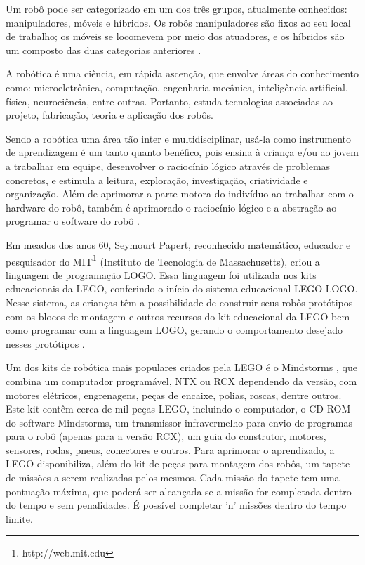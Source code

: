 Um robô pode ser categorizado em um dos três grupos, atualmente conhecidos: manipuladores, móveis e híbridos. Os robôs manipuladores são fixos ao seu local de trabalho; os móveis se locomevem por meio dos atuadores, e os híbridos são um composto das duas categorias anteriores  .

A robótica é uma ciência, em rápida ascenção, que envolve áreas do conhecimento como: microeletrônica, computação, engenharia mecânica, inteligência artificial, física, neurociência, entre outras. Portanto, estuda tecnologias associadas ao projeto, fabricação, teoria e aplicação dos robôs.
	
Sendo a robótica uma área tão inter e multidisciplinar, usá-la como instrumento de aprendizagem é um tanto quanto benéfico, pois ensina à criança e/ou ao jovem a trabalhar em equipe, desenvolver o raciocínio lógico através de problemas concretos, e estimula a leitura, exploração, investigação, criatividade e organização. Além de aprimorar a parte motora do indivíduo ao trabalhar com o hardware do robô, também é aprimorado o raciocínio lógico e a abstração ao programar o software do robô \cite{da2009roboeduc}. 

Em meados dos anos 60, Seymourt Papert, reconhecido matemático, educador e pesquisador do MIT\footnote{http://web.mit.edu} (Instituto de Tecnologia de Massachusetts), criou a linguagem de programação LOGO. Essa linguagem foi utilizada nos kits educacionais da LEGO, conferindo o início do sistema educacional LEGO-LOGO. Nesse sistema, as crianças têm a possibilidade de construir seus robôs protótipos com os blocos de montagem e outros recursos do kit educacional da LEGO bem como programar com a linguagem LOGO, gerando o comportamento desejado nesses protótipos \cite{da2009roboeduc}.

Um dos kits de robótica mais populares criados pela LEGO é o Mindstorms \cite{da2009roboeduc}, que combina um computador programável, NTX ou RCX dependendo da versão, com motores elétricos, engrenagens, peças de encaixe, polias, roscas, dentre outros. Este kit contêm cerca de mil peças LEGO, incluindo o computador, o CD-ROM do software Mindstorms, um transmissor infravermelho para envio de programas para o robô (apenas para a versão RCX), um guia do construtor, motores, sensores, rodas, pneus, conectores e outros. Para aprimorar o aprendizado, a LEGO disponibiliza, além do kit de peças para montagem dos robôs, um tapete de missões a serem realizadas pelos mesmos. Cada missão do tapete tem uma pontuação máxima, que poderá ser alcançada se a missão for completada dentro do tempo e sem penalidades. É possível completar 'n' missões dentro do tempo limite.

